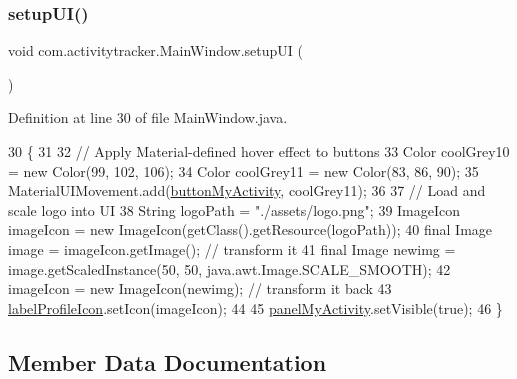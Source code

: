 \subsubsection{\texorpdfstring{setup\+U\+I()}{setupUI()}}
{\footnotesize\ttfamily void com.\+activitytracker.\+Main\+Window.\+setup\+UI (\begin{DoxyParamCaption}{ }\end{DoxyParamCaption})\hspace{0.3cm}{\ttfamily [private]}}



Definition at line 30 of file Main\+Window.\+java.


\begin{DoxyCode}
30                            \{
31 
32         \textcolor{comment}{// Apply Material-defined hover effect to buttons}
33         Color coolGrey10 = \textcolor{keyword}{new} Color(99, 102, 106);
34         Color coolGrey11 = \textcolor{keyword}{new} Color(83, 86, 90);
35         MaterialUIMovement.add(\mbox{\hyperlink{classcom_1_1activitytracker_1_1_main_window_adec15801f8e16f769bd954e351a663fa}{buttonMyActivity}}, coolGrey11);
36 
37         \textcolor{comment}{// Load and scale logo into UI}
38         String logoPath = \textcolor{stringliteral}{"./assets/logo.png"};
39         ImageIcon imageIcon = \textcolor{keyword}{new} ImageIcon(getClass().getResource(logoPath));
40         \textcolor{keyword}{final} Image image = imageIcon.getImage(); \textcolor{comment}{// transform it}
41         \textcolor{keyword}{final} Image newimg = image.getScaledInstance(50, 50, java.awt.Image.SCALE\_SMOOTH);
42         imageIcon = \textcolor{keyword}{new} ImageIcon(newimg);  \textcolor{comment}{// transform it back}
43         \mbox{\hyperlink{classcom_1_1activitytracker_1_1_main_window_a05a555ba49d30b00573d07e5acd39e0a}{labelProfileIcon}}.setIcon(imageIcon);
44 
45         \mbox{\hyperlink{classcom_1_1activitytracker_1_1_main_window_a89833c824727a496f4a889177d4d3f3c}{panelMyActivity}}.setVisible(\textcolor{keyword}{true});
46     \}
\end{DoxyCode}


\subsection{Member Data Documentation}
\mbox{\label{classcom_1_1activitytracker_1_1_main_window_adec15801f8e16f769bd954e351a663fa}} 
